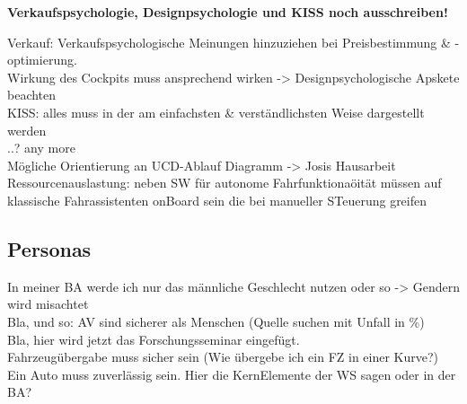 \begin{itemize}
\end{itemize}

\begin{large}
	\textbf{Verkaufspsychologie, Designpsychologie und KISS noch ausschreiben!}\\
	
\end{large}

Verkauf: Verkaufspsychologische Meinungen hinzuziehen bei Preisbestimmung \& - optimierung.\\
Wirkung des Cockpits muss ansprechend wirken -> Designpsychologische Apskete beachten\\
KISS: alles muss in der am einfachsten \& verständlichsten Weise dargestellt werden\\
..? any more\\
Mögliche Orientierung an UCD-Ablauf Diagramm -> Josis Hausarbeit\\
Ressourcenauslastung: neben SW für autonome Fahrfunktionaöität müssen auf klassische Fahrassistenten onBoard sein die bei manueller STeuerung greifen\\
\subsection{Personas}
In meiner BA werde ich nur das männliche Geschlecht nutzen oder so -> Gendern wird misachtet\\
Bla, und so: AV sind sicherer als Menschen (Quelle suchen mit Unfall in \%)\\
Bla, hier wird jetzt das Forschungsseminar eingefügt.\\
Fahrzeugübergabe muss sicher sein (Wie übergebe ich ein FZ in einer Kurve?)\\
Ein Auto muss zuverlässig sein.	
Hier die KernElemente der WS sagen oder in der BA?